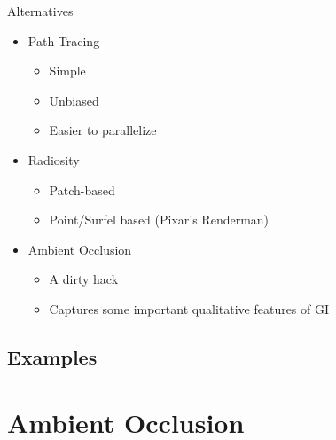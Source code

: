 \documentclass{beamer}
\begin{document}
    \begin{frame}{Alternatives}
      \begin{itemize}
        \item<2-> Path Tracing
          \begin{itemize}
            \item<3-> Simple
            \item<4-> Unbiased
            \item<5-> Easier to parallelize
          \end{itemize}
        \item<6-> Radiosity
          \begin{itemize}
            \item<7-> Patch-based
            \item<8-> Point/Surfel based (Pixar's Renderman)
          \end{itemize}
        \item<9-> Ambient Occlusion
          \begin{itemize}
            \item<10-> A dirty hack
            \item<11-> Captures some important qualitative features of GI
          \end{itemize}
      \end{itemize}
    \end{frame}

    \subsection{Examples}

  \section{Ambient Occlusion}
\end{document}
